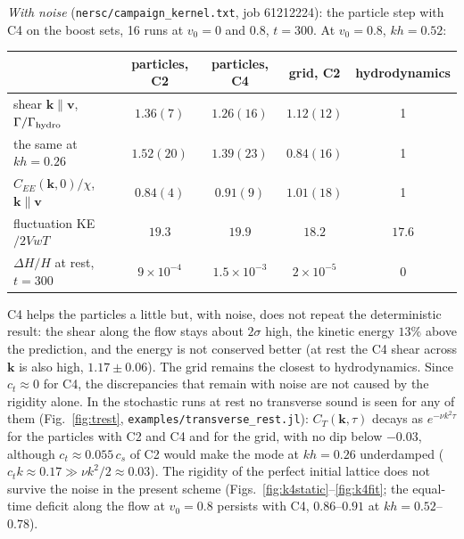 \documentclass[11pt,aps,preprint,nofootinbib,superscriptaddress,tightenlines]{revtex4-2}
\def\Fig#1{Fig.~\ref{#1}}
\begin{document}
\emph{With noise} (\texttt{nersc/campaign\_kernel.txt}, job 61212224): the particle step with C4 on the boost sets,
16 runs at $v_0=0$ and $0.8$, $t=300$.  At $v_0=0.8$, $kh=0.52$:
\begin{center}
\begin{tabular}{lcccc}
\hline
 & particles, C2 & particles, C4 & grid, C2 & hydrodynamics \\ \hline
shear $\bm k\parallel\bm v$, $\Gamma/\Gamma_{\rm hydro}$ & $1.36(7)$ & $1.26(16)$ & $1.12(12)$ & 1 \\
the same at $kh=0.26$ & $1.52(20)$ & $1.39(23)$ & $0.84(16)$ & 1 \\
$C_{EE}(\bm k,0)/\chi$, $\bm k\parallel\bm v$ & $0.84(4)$ & $0.91(9)$ & $1.01(18)$ & 1 \\
fluctuation KE$/2VwT$ & $19.3$ & $19.9$ & $18.2$ & $17.6$ \\
$\Delta H/H$ at rest, $t=300$ & $9\times10^{-4}$ & $1.5\times10^{-3}$ & $2\times10^{-5}$ & 0 \\
\hline
\end{tabular}
\end{center}
C4 helps the particles a little but, with noise, does not repeat the deterministic result: the shear
along the flow stays about $2\sigma$ high, the kinetic energy $13\%$ above the prediction, and the energy is
not conserved better (at rest the C4 shear across $\bm k$ is also high, $1.17\pm0.06$).  The grid remains the
closest to hydrodynamics.  Since $c_t\approx0$ for C4, the discrepancies that remain with noise are not
caused by the rigidity alone.  In the stochastic runs at rest no transverse sound is seen for any of
them (\Fig{fig:trest}, \texttt{examples/transverse\_rest.jl}): $C_T(\bm k,\tau)$ decays as $e^{-\nu k^2\tau}$ for the particles with C2
and C4 and for the grid, with no dip below $-0.03$, although $c_t\approx0.055\,c_s$ of C2 would make the mode at
$kh=0.26$ underdamped ($c_tk\approx0.17\gg\nu k^2/2\approx0.03$).  The rigidity of the perfect initial lattice does not survive
the noise in the present scheme (Figs.~\ref{fig:k4static}--\ref{fig:k4fit}; the equal-time deficit along the flow at
$v_0=0.8$ persists with C4, $0.86$--$0.91$ at $kh=0.52$--$0.78$).
\end{document}
